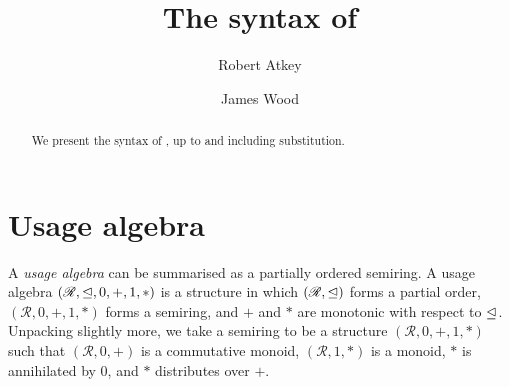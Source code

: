 \documentclass[acmsmall,review]{acmart}
\begin{document}
\title{The syntax of \name}

\author{Robert Atkey}

\author{James Wood}

\begin{abstract}
  We present the syntax of \name, up to and including substitution.
\end{abstract}

\maketitle

\section{Usage algebra}

A \emph{usage algebra} can be summarised as a partially ordered semiring.
A usage algebra $(\mathscr R, \trianglelefteq, 0, +, 1, *)$ is a structure in which
$(\mathscr R, \trianglelefteq)$ forms a partial order, $(\mathscr R, 0, +, 1, *)$ forms
a semiring, and $+$ and $*$ are monotonic with respect to $\trianglelefteq$.
Unpacking slightly more, we take a semiring to be a structure
$(\mathscr R, 0, +, 1, *)$ such that $(\mathscr R, 0, +)$ is a commutative
monoid, $(\mathscr R, 1, *)$ is a monoid, $*$ is annihilated by $0$, and $*$
distributes over $+$.
\end{document}
